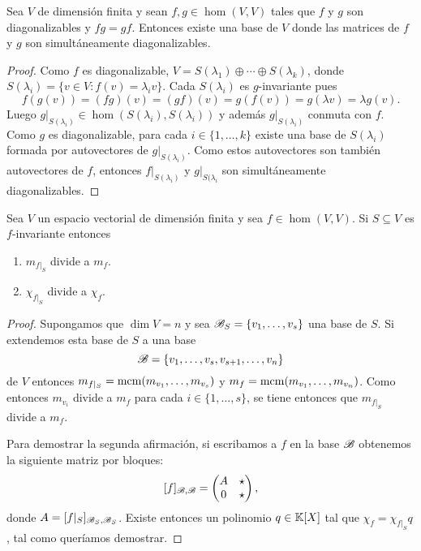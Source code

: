 \begin{prop}
    Sea $V$ de dimensión finita y sean $f,g\in\hom(V,V)$ tales que $f$ y $g$
    son diagonalizables y $fg=gf$. Entonces existe una base de $V$ donde las
    matrices de $f$ y $g$ son simultáneamente diagonalizables.

    \begin{proof}
        Como $f$ es diagonalizable, $V=S(\lambda_1)\oplus\cdots\oplus S(\lambda_k)$, donde
        $S(\lambda_i)=\{v\in V:f(v)=\lambda_iv\}$. Cada $S(\lambda_i)$ es $g$-invariante pues
        \[
            f(g(v))=(fg)(v)=(gf)(v)=g(f(v))=g(\lambda v)=\lambda g(v).
        \]
        Luego $g|_{S(\lambda_i)}\in\hom(S(\lambda_i),S(\lambda_i))$ y además
        $g|_{S(\lambda_i)}$ conmuta con $f$. Como $g$ es diagonalizable, para
        cada $i\in\{1,\dots,k\}$ existe una base de $S(\lambda_i)$ formada por 
        autovectores de $g|_{S(\lambda_i)}$. Como estos autovectores son
        también autovectores de $f$, entonces $f|_{S(\lambda_i)}$ y
        $g|_{S(\lambda_i}$ son simultáneamente diagonalizables.
    \end{proof}
\end{prop}

\begin{prop}
    Sea $V$ un espacio vectorial de dimensión finita y sea $f\in\hom(V,V)$. Si
    $S\subseteq V$ es $f$-invariante entonces
	\begin{enumerate}
		\item $m_{f|_S}$ divide a $m_f$.
		\item $\chi_{f|_S}$ divide a $\chi_f$.
	\end{enumerate}

	\begin{proof}
		Supongamos que $\dim V=n$ y sea $\mathscr{B}_S=\{v_1,\dots,v_s\}$ una base de $S$. Si
		extendemos esta base de $S$ a una base
		\[
			\mathscr{B}=\{v_1,\dots,v_s,v_{s+1},\dots,v_n\}
		\]
		de $V$ entonces
		$m_{f|_S}=\mathrm{mcm}(m_{v_1},\dots,m_{v_s})$ y
		$m_f=\mathrm{mcm}(m_{v_1},\dots,m_{v_n})$. Como entonces $m_{v_i}$ divide a
		$m_f$ para cada $i\in\{1,\dots,s\}$, se tiene entonces que $m_{f|_S}$
		divide a $m_f$.

		Para demostrar la segunda afirmación, si escribamos a $f$ en la base
		$\mathscr{B}$ obtenemos la siguiente matriz por bloques:
		\[
			[f]_{\mathscr{B},\mathscr{B}}=\begin{pmatrix}
				A & \star\\
				0 & \star
			\end{pmatrix},
		\]
		donde $A=[f|_S]_{\mathscr{B}_S,\mathscr{B}_S}$. Existe entonces un polinomio
		$q\in\mathbb{K}[X]$ tal que $\chi_f=\chi_{f|_S}q$, tal como queríamos
		demostrar.
	\end{proof}
\end{prop}

